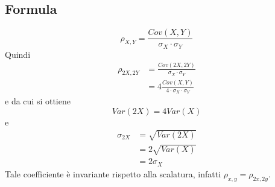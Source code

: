 \documentclass[11pt]{report}
\begin{document}
\subsection{Formula}
\begin{equation}
    \rho_{X,Y} = \frac{Cov(X,Y)}{\sigma_X \cdot \sigma_Y}
\end{equation}
Quindi
\begin{equation}
    \begin{split}
        \rho_{2X,2Y} & = \frac{Cov(2X,2Y)}{\sigma_X \cdot \sigma_Y}\\
        & = 4\frac{Cov(X,Y)}{4 \cdot \sigma_X \cdot \sigma_Y}
    \end{split}
\end{equation}
e da cui si ottiene
\begin{equation}
    Var(2X) = 4Var(X)
\end{equation}
e
\begin{equation}
    \begin{split}
        \sigma_{2X} & = \sqrt{Var(2X)}\\
        & = 2 \sqrt{Var(X)}\\
        & = 2 \sigma_X
    \end{split}
\end{equation}
Tale coefficiente è invariante rispetto alla scalatura, infatti $\rho_{x,y}=\rho_{2x,2y}$.
\end{document}
